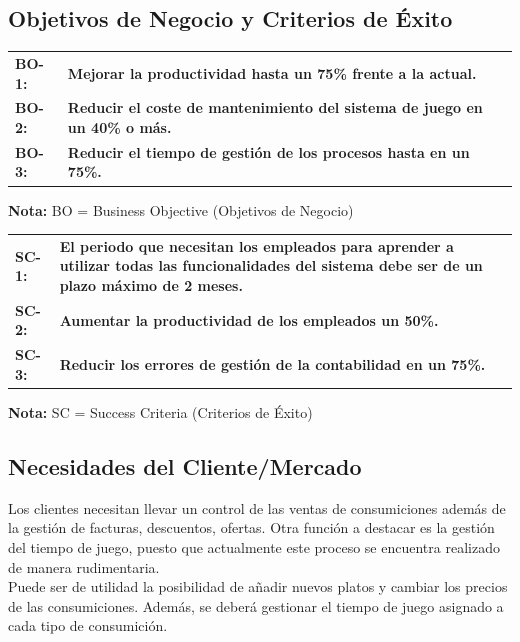 \documentclass[a4paper,11pt]{article}
\begin{document}
		\subsection{Objetivos de Negocio y Criterios de Éxito}
			\begin{center}
				\begin{tabular}{l p{11cm}}
					\textbf{BO-1:} & \textbf{Mejorar la productividad hasta un 75\% frente a la actual.} \\
					\textbf{BO-2:} & \textbf{Reducir el coste de mantenimiento del sistema de juego en un 40\% o 											más.} \\
					\textbf{BO-3:} & \textbf{Reducir el tiempo de gestión de los procesos hasta en un 75\%.} \\
				\end{tabular}
			\end{center}
			\textbf{Nota:} BO = Business Objective (Objetivos de Negocio)
			\begin{center}
				\begin{tabular}{l p{11cm}}
					\textbf{SC-1:} & \textbf{El periodo que necesitan los empleados para aprender a utilizar todas las 											funcionalidades del sistema debe ser de un plazo máximo de 2 meses.}\\
					\textbf{SC-2:} & \textbf{Aumentar la productividad de los empleados un 50\%.} \\
					\textbf{SC-3:} & \textbf{Reducir los errores de gestión de la contabilidad en un 75\%.} \\
				\end{tabular}
			\end{center}
			\textbf{Nota:} SC = Success Criteria (Criterios de Éxito)
		\subsection{Necesidades del Cliente/Mercado}
			Los clientes necesitan llevar un control de las ventas de consumiciones además de la gestión de facturas, 						descuentos, ofertas. Otra función a destacar es la gestión del tiempo de juego, puesto que actualmente este 					proceso se encuentra realizado de manera rudimentaria.\\

			Puede ser de utilidad la posibilidad de añadir nuevos platos y cambiar los precios de las consumiciones. Además,   					se deberá gestionar el tiempo de juego asignado a cada tipo de consumición.\\
\end{document}
